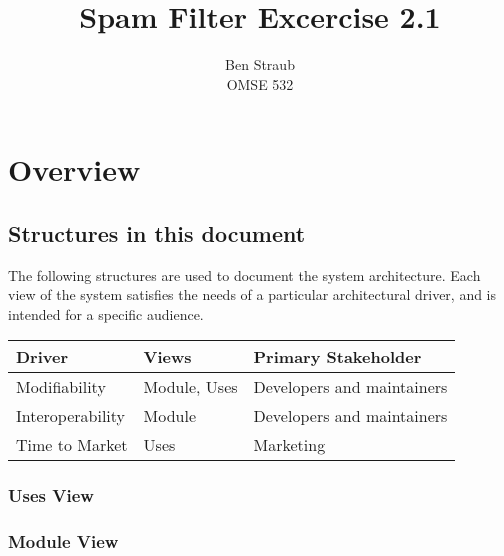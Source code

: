 \documentclass[11pt,letterpaper]{article}
\begin{document}
\author{Ben Straub\\OMSE 532}
\title{Spam Filter Excercise 2.1}
\maketitle

\setcounter{tocdepth}{2}
\tableofcontents
\clearpage



\section{Overview}


\subsection{Structures in this document}

The following structures are used to document the system architecture.  Each
view of the system satisfies the needs of a particular architectural driver,
and is intended for a specific audience.

\begin{center}
  \begin{tabular}[H]{lll}
    \textbf{Driver}  & \textbf{Views} & \textbf{Primary Stakeholder} \\
    \hline \hline                                                    
    Modifiability    & Module, Uses   & Developers and maintainers   \\
    Interoperability & Module         & Developers and maintainers   \\
    Time to Market   & Uses           & Marketing                    \\
  \end{tabular}
\end{center}

\subsubsection{Uses View}


\subsubsection{Module View}
\end{document}
